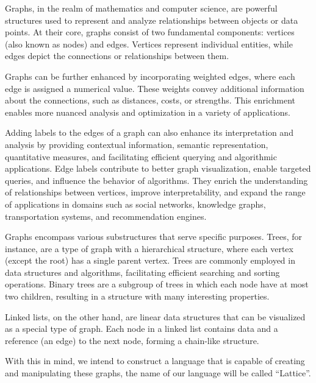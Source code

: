 Graphs, in the realm of mathematics and computer science, are powerful structures used to represent and analyze relationships between objects or data points.
At their core, graphs consist of two fundamental components: vertices (also known as nodes) and edges.
Vertices represent individual entities, while edges depict the connections or relationships between them.

Graphs can be further enhanced by incorporating weighted edges, where each edge is assigned a numerical value.
These weights convey additional information about the connections, such as distances, costs, or strengths.
This enrichment enables more nuanced analysis and optimization in a variety of applications.

Adding labels to the edges of a graph can also enhance its interpretation and analysis by providing contextual information, semantic representation, quantitative measures, and facilitating efficient querying and algorithmic applications.
Edge labels contribute to better graph visualization, enable targeted queries, and influence the behavior of algorithms.
They enrich the understanding of relationships between vertices, improve interpretability, and expand the range of applications in domains such as social networks, knowledge graphs, transportation systems, and recommendation engines.

Graphs encompass various substructures that serve specific purposes.
Trees, for instance, are a type of graph with a hierarchical structure, where each vertex (except the root) has a single parent vertex.
Trees are commonly employed in data structures and algorithms, facilitating efficient searching and sorting operations.
Binary trees are a subgroup of trees in which each node have at most two children, resulting in a structure with many interesting properties.

Linked lists, on the other hand, are linear data structures that can be visualized as a special type of graph.
Each node in a linked list contains data and a reference (an edge) to the next node, forming a chain-like structure.

With this in mind, we intend to construct a language that is capable of creating and manipulating these graphs, the
name of our language will be called ``Lattice''.